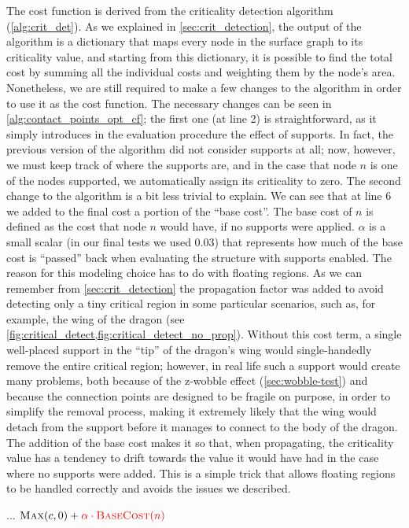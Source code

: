 The cost function is derived from the criticality detection algorithm (\cref{alg:crit_det}).
As we explained in \cref{sec:crit_detection}, the output of the algorithm is
a dictionary that maps every node in the surface graph to its criticality value, and
starting from this dictionary, it is possible to find the total cost by summing
all the individual costs and weighting them by the node's area.
Nonetheless, we are still required to make a few changes to the algorithm
in order to use it as the cost function.
The necessary changes can be seen in \cref{alg:contact_points_opt_cf};
the first one (at line 2) is straightforward, as it simply
introduces in the evaluation procedure the effect of supports. In fact, the previous version
of the algorithm did not consider supports at all; now, however,
we must keep track of where the supports are, and in the case that node $n$
is one of the nodes supported, we automatically assign its criticality to zero.
The second change to the algorithm is a bit less trivial to explain.
We can see that at line 6 we added to the final cost a portion of the ``base cost''.
The base cost of $n$ is defined as the cost that node $n$ would have, if no supports were applied.
$\alpha$ is a small scalar (in our final tests we used 0.03) that represents how much of the
base cost is ``passed'' back when evaluating the structure with supports enabled.
The reason for this modeling choice has to do with floating regions.
As we can remember from \cref{sec:crit_detection} the propagation factor
was added to avoid detecting only a tiny critical region in some particular
scenarios, such as, for example, the wing of the dragon 
(see \cref{fig:critical_detect,fig:critical_detect_no_prop}).
Without this cost term, a single well-placed support in the ``tip'' of the dragon's wing
would single-handedly remove the entire critical region; however, in real life such a
support would create many problems, both because of the z-wobble effect (\cref{sec:wobble-test})
and because the connection points are designed
to be fragile on purpose, in order to simplify the removal process, making it extremely
likely that the wing would detach from the support before it manages to connect to the body
of the dragon.
The addition of the base cost makes it so that, when propagating,
the criticality value has a tendency to drift towards the value it would have
had in the case where no supports were added. This is a simple trick that allows
floating regions to be handled correctly and avoids the issues we described.


\begin{algorithm}[ht]
\caption{Updates to criticality }
\begin{algorithmic}[1]
            \State {}
        \EndIf
        \State ...
        \State \Return $\Call{Max}{c, 0} + \textcolor{red}{\alpha \cdot \Call{BaseCost}{n}}$
    \EndProcedure
\end{algorithmic}
\label{alg:contact_points_opt_cf}
\end{algorithm}

